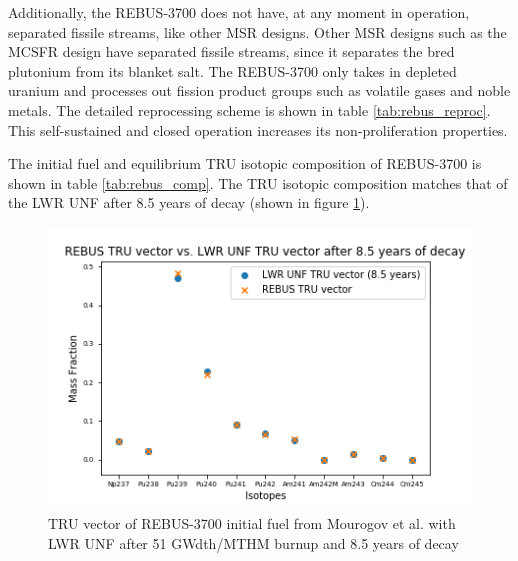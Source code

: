 Additionally, the REBUS-3700 does not have, at any moment in
operation, separated fissile streams, like other \gls{MSR} designs.
Other \gls{MSR} designs such as the
\gls{MCSFR} design \cite{smith_assessment_1974}
have separated fissile streams, since it separates the bred plutonium from its blanket salt.
The REBUS-3700 only takes in depleted uranium and processes out
fission product groups such as volatile gases and noble metals.
The detailed reprocessing scheme is shown
in table \ref{tab:rebus_reproc}. 
This self-sustained and closed operation increases its non-proliferation
properties.

The initial fuel and equilibrium \gls{TRU} isotopic composition of REBUS-3700 is
shown in table \ref{tab:rebus_comp}. The \gls{TRU} isotopic composition
matches that of the \gls{LWR} \gls{UNF} after 8.5 years of decay (shown
in figure \ref{fig:trutru}).


\begin{figure}[htbp!]
	\begin{center}
		\includegraphics[scale=0.7]{./images/us/trutru.png}
	\end{center}
	\caption{\gls{TRU} vector of REBUS-3700 initial fuel from Mourogov et al. \cite{mourogov_potentialities_2006}
		with \gls{LWR} \gls{UNF} after 51 GWdth/MTHM burnup and 8.5 years of decay}
	\label{fig:trutru}
\end{figure}


